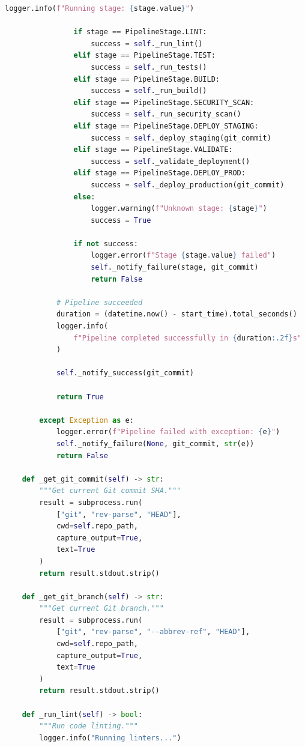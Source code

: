 \begin{lstlisting}[language=Python, caption={Comprehensive CI/CD Framework}]
                logger.info(f"Running stage: {stage.value}")

                if stage == PipelineStage.LINT:
                    success = self._run_lint()
                elif stage == PipelineStage.TEST:
                    success = self._run_tests()
                elif stage == PipelineStage.BUILD:
                    success = self._run_build()
                elif stage == PipelineStage.SECURITY_SCAN:
                    success = self._run_security_scan()
                elif stage == PipelineStage.DEPLOY_STAGING:
                    success = self._deploy_staging(git_commit)
                elif stage == PipelineStage.VALIDATE:
                    success = self._validate_deployment()
                elif stage == PipelineStage.DEPLOY_PROD:
                    success = self._deploy_production(git_commit)
                else:
                    logger.warning(f"Unknown stage: {stage}")
                    success = True

                if not success:
                    logger.error(f"Stage {stage.value} failed")
                    self._notify_failure(stage, git_commit)
                    return False

            # Pipeline succeeded
            duration = (datetime.now() - start_time).total_seconds()
            logger.info(
                f"Pipeline completed successfully in {duration:.2f}s"
            )

            self._notify_success(git_commit)

            return True

        except Exception as e:
            logger.error(f"Pipeline failed with exception: {e}")
            self._notify_failure(None, git_commit, str(e))
            return False

    def _get_git_commit(self) -> str:
        """Get current Git commit SHA."""
        result = subprocess.run(
            ["git", "rev-parse", "HEAD"],
            cwd=self.repo_path,
            capture_output=True,
            text=True
        )
        return result.stdout.strip()

    def _get_git_branch(self) -> str:
        """Get current Git branch."""
        result = subprocess.run(
            ["git", "rev-parse", "--abbrev-ref", "HEAD"],
            cwd=self.repo_path,
            capture_output=True,
            text=True
        )
        return result.stdout.strip()

    def _run_lint(self) -> bool:
        """Run code linting."""
        logger.info("Running linters...")


\end{lstlisting}
